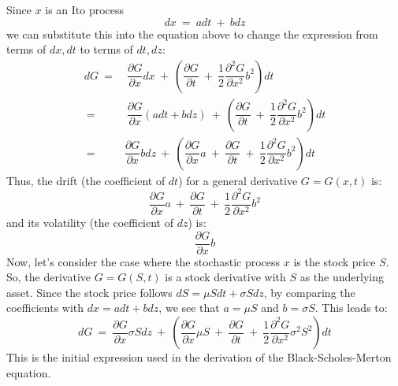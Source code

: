 \documentclass[uplatex,a4j,12pt,dvipdfmx]{jsarticle}
\begin{document}
Since $x$ is an Ito process
$$
	dx
	\ = \
	adt
	\ + \
	bdz
$$
we can substitute this into the equation above to change the expression from terms of $dx, dt$ to terms of $dt, dz$:
\begin{align}
	d G
	\ = & \
	\dfrac{\partial G}{\partial x} d x
	\ + \
	\left(
	\dfrac{\partial G}{\partial t}
	\ + \
	\dfrac{1}{2} \dfrac{\partial^{2} G}{\partial x^{2}} b^{2}
	\right)
	dt
	\\
	\ = & \
	\dfrac{\partial G}{\partial x} (adt+bdz)
	\ + \
	\left(
	\dfrac{\partial G}{\partial t}
	\ + \
	\dfrac{1}{2} \dfrac{\partial^{2} G}{\partial x^{2}} b^{2}
	\right)
	dt
	\\
	\ = &
	\dfrac{\partial G}{\partial x} bdz
	\ + \
	\left(
	\dfrac{\partial G}{\partial x} a
	\ + \
	\dfrac{\partial G}{\partial t}
	\ + \
	\dfrac{1}{2} \dfrac{\partial^{2} G}{\partial x^{2}} b^{2}
	\right)
	dt
\end{align}
Thus, the drift (the coefficient of $dt$) for a general derivative $G=G(x,t)$ is:
$$
	\dfrac{\partial G}{\partial x} a
	\ + \
	\dfrac{\partial G}{\partial t}
	\ + \
	\dfrac{1}{2} \dfrac{\partial^{2} G}{\partial x^{2}} b^{2}
$$
and its volatility (the coefficient of $dz$) is:
$$
	\dfrac{\partial G}{\partial x} b
$$
Now, let's consider the case where the stochastic process $x$ is the stock price $S$. So, the derivative $G=G(S,t)$ is a stock derivative with $S$ as the underlying asset. Since the stock price follows $dS = \mu S dt + \sigma S dz$, by comparing the coefficients with $dx=adt+bdz$, we see that $a= \mu S$ and $b=\sigma S$.
This leads to:
$$
	dG
	\ = \
	\dfrac{\partial G}{\partial x} \sigma S dz
	\ + \
	\left(
	\dfrac{\partial G}{\partial x} \mu S
	\ + \
	\dfrac{\partial G}{\partial t}
	\ + \
	\dfrac{1}{2} \dfrac{\partial^{2} G}{\partial x^{2}} \sigma^{2} S^{2}
	\right)
	dt
$$
This is the initial expression used in the derivation of the Black-Scholes-Merton equation.
\end{document}
